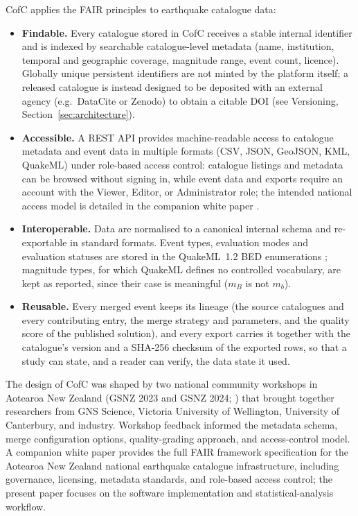 \documentclass[12pt]{article}
\begin{document}
CofC applies the FAIR principles to earthquake
catalogue data:
\begin{itemize}[leftmargin=*]
  \item \textbf{Findable.}  Every catalogue stored in CofC receives a
    stable internal identifier and is indexed by searchable catalogue-level
    metadata (name, institution, temporal and geographic coverage, magnitude
    range, event count, licence).  Globally unique persistent identifiers are
    not minted by the platform itself; a released catalogue is instead designed
    to be deposited with an external agency (e.g.\ DataCite or Zenodo) to
    obtain a citable DOI (see Versioning, Section~\ref{sec:architecture}).
  \item \textbf{Accessible.}  A REST API provides machine-readable access
    to catalogue metadata and event data in multiple formats (CSV, JSON,
    GeoJSON, KML, QuakeML) under role-based access control: catalogue listings
    and metadata can be browsed without signing in, while event data and exports
    require an account with the Viewer, Editor, or Administrator role; the
    intended national access model is detailed in the companion white paper
    \citep{graham2026fair}.
  \item \textbf{Interoperable.}  Data are normalised to a canonical internal
    schema and re-exportable in standard formats.  Event types, evaluation modes
    and evaluation statuses are stored in the QuakeML~1.2 BED enumerations
    \citep{schorlemmer2011}; magnitude types, for which QuakeML defines no
    controlled vocabulary, are kept as reported, since their case is meaningful
    ($m_B$ is not $m_b$).
  \item \textbf{Reusable.}  Every merged event keeps its lineage (the source
    catalogues and every contributing entry, the merge strategy and parameters,
    and the quality score of the published solution), and every export carries
    it together with the catalogue's version and a SHA-256 checksum of the
    exported rows, so that a study can state, and a reader can verify, the data
    state it used.
\end{itemize}

The design of CofC was shaped by two national community workshops in
Aotearoa New Zealand (GSNZ 2023 and GSNZ 2024; \citealt{gsnzworkshop2023,
gsnzworkshop2024}) that brought together researchers from GNS Science,
Victoria University of Wellington, University of Canterbury, and industry.
Workshop feedback informed the metadata schema, merge configuration options,
quality-grading approach, and access-control model.  A companion white paper \citep{graham2026fair} provides the full
FAIR framework specification for the Aotearoa New Zealand national earthquake
catalogue infrastructure, including governance, licensing, metadata standards,
and role-based access control; the present paper focuses on the software
implementation and statistical-analysis workflow.
\end{document}
